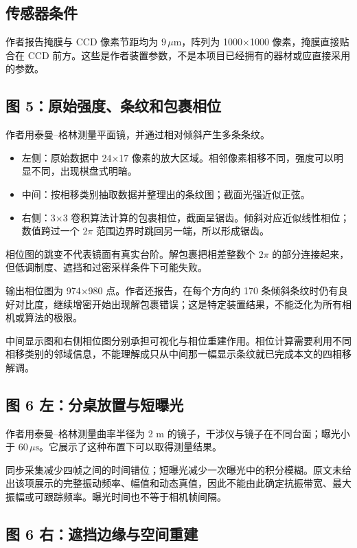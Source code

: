 \documentclass[UTF8,fontset=fandol,11pt,a4paper]{ctexart}
\begin{document}
\subsection{传感器条件}

作者报告掩膜与 CCD 像素节距均为 \(9\,\mu\mathrm m\)，阵列为 1000×1000 像素，掩膜直接贴合在 CCD 前方。这些是作者装置参数，不是本项目已经拥有的器材或应直接采用的参数。

\subsection{图 5：原始强度、条纹和包裹相位}

作者用泰曼–格林测量平面镜，并通过相对倾斜产生多条条纹。

\begin{itemize}
\item 左侧：原始数据中 24×17 像素的放大区域。相邻像素相移不同，强度可以明显不同，出现棋盘式明暗。
\item 中间：按相移类别抽取数据并整理出的条纹图；截面光强近似正弦。
\item 右侧：3×3 卷积算法计算的包裹相位，截面呈锯齿。倾斜对应近似线性相位；数值跨过一个 \(2\pi\) 范围边界时跳回另一端，所以形成锯齿。

\end{itemize}
相位图的跳变不代表镜面有真实台阶。解包裹把相差整数个 \(2\pi\) 的部分连接起来，但低调制度、遮挡和过密采样条件下可能失败。

输出相位图为 974×980 点。作者还报告，在每个方向约 170 条倾斜条纹时仍有良好对比度，继续增密开始出现解包裹错误；这是特定装置结果，不能泛化为所有相机或算法的极限。

中间显示图和右侧相位图分别承担可视化与相位重建作用。相位计算需要利用不同相移类别的邻域信息，不能理解成只从中间那一幅显示条纹就已完成本文的四相移解调。

\subsection{图 6 左：分桌放置与短曝光}

作者用泰曼–格林测量曲率半径为 2 m 的镜子，干涉仪与镜子在不同台面；曝光小于 \(60\,\mu\mathrm s\)。它展示了这种布置下可以取得测量结果。

同步采集减少四帧之间的时间错位；短曝光减少一次曝光中的积分模糊。原文未给出该项展示的完整振动频率、幅值和动态真值，因此不能由此确定抗振带宽、最大振幅或可跟踪频率。曝光时间也不等于相机帧间隔。

\subsection{图 6 右：遮挡边缘与空间重建}
\end{document}
